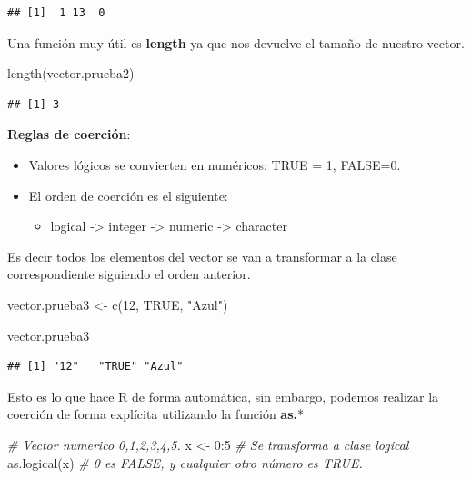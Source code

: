\documentclass[
  12pt,
]{book}
\newenvironment{Shaded}{\begin{snugshade}}{\end{snugshade}}
\newcommand{\CommentTok}[1]{\textcolor[rgb]{0.56,0.35,0.01}{\textit{#1}}}
\newcommand{\ConstantTok}[1]{\textcolor[rgb]{0.00,0.00,0.00}{#1}}
\newcommand{\DecValTok}[1]{\textcolor[rgb]{0.00,0.00,0.81}{#1}}
\newcommand{\FunctionTok}[1]{\textcolor[rgb]{0.00,0.00,0.00}{#1}}
\newcommand{\NormalTok}[1]{#1}
\newcommand{\OtherTok}[1]{\textcolor[rgb]{0.56,0.35,0.01}{#1}}
\newcommand{\SpecialCharTok}[1]{\textcolor[rgb]{0.00,0.00,0.00}{#1}}
\newcommand{\StringTok}[1]{\textcolor[rgb]{0.31,0.60,0.02}{#1}}
\providecommand{\tightlist}{%
  \setlength{\itemsep}{0pt}\setlength{\parskip}{0pt}}
\begin{document}
\begin{verbatim}
## [1]  1 13  0
\end{verbatim}

Una función muy útil es \textbf{length} ya que nos devuelve el tamaño de nuestro vector.

\begin{Shaded}
\begin{Highlighting}[]
\FunctionTok{length}\NormalTok{(vector.prueba2)}
\end{Highlighting}
\end{Shaded}

\begin{verbatim}
## [1] 3
\end{verbatim}

\textbf{Reglas de coerción}:

\begin{itemize}
\item
  Valores lógicos se convierten en numéricos: TRUE = 1, FALSE=0.
\item
  El orden de coerción es el siguiente:

  \begin{itemize}
  \tightlist
  \item
    logical -\textgreater{} integer -\textgreater{} numeric -\textgreater{} character
  \end{itemize}
\end{itemize}

Es decir todos los elementos del vector se van a transformar a la clase correspondiente siguiendo el orden anterior.

\begin{Shaded}
\begin{Highlighting}[]
\NormalTok{vector.prueba3 }\OtherTok{\textless{}{-}} \FunctionTok{c}\NormalTok{(}\DecValTok{12}\NormalTok{, }\ConstantTok{TRUE}\NormalTok{, }\StringTok{"Azul"}\NormalTok{)}

\NormalTok{vector.prueba3}
\end{Highlighting}
\end{Shaded}

\begin{verbatim}
## [1] "12"   "TRUE" "Azul"
\end{verbatim}

Esto es lo que hace R de forma automática, sin embargo, podemos realizar la coerción de forma explícita utilizando la función \textbf{as.}*

\begin{Shaded}
\begin{Highlighting}[]
\CommentTok{\# Vector numerico 0,1,2,3,4,5.}
\NormalTok{x }\OtherTok{\textless{}{-}} \DecValTok{0}\SpecialCharTok{:}\DecValTok{5}
\CommentTok{\# Se transforma a clase logical}
\FunctionTok{as.logical}\NormalTok{(x) }\CommentTok{\# 0 es FALSE, y cualquier otro número es TRUE.}
\end{Highlighting}
\end{Shaded}
\end{document}

